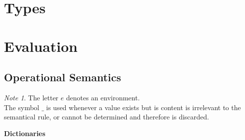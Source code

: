 \documentclass[a4paper, 11pt]{article}
\theoremstyle{plain}%
\theoremstyle{definition}
\theoremstyle{remark}
\newtheorem*{note}{Note}
\begin{document}
\begin{multicols}{2}
\section{Types}

\section{Evaluation}
\subsection{Operational Semantics}

\begin{note}
	The letter $e$ denotes an environment. \\
	The symbol $\_$ is used whenever a value exists but is content is irrelevant
	to the semantical rule, or cannot be determined and therefore is discarded.
\end{note}


\textbf{Dictionaries}


\end{multicols}
\end{document}
